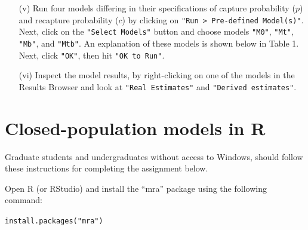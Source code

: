 \documentclass[12pt]{article}\usepackage[]{graphicx}\usepackage[]{color}
\makeatletter
\newcommand{\hlstr}[1]{\textcolor[rgb]{0.749,0.012,0.012}{#1}}%
\newcommand{\hlstd}[1]{\textcolor[rgb]{0,0,0}{#1}}%
\newcommand{\hlkwd}[1]{\textcolor[rgb]{0.004,0.004,0.506}{#1}}%
\newenvironment{kframe}{%
 \def\at@end@of@kframe{}%
 \ifinner\ifhmode%
  \def\at@end@of@kframe{\end{minipage}}%
  \begin{minipage}{\columnwidth}%
 \fi\fi%
 \def\FrameCommand##1{\hskip\@totalleftmargin \hskip-\fboxsep
 \colorbox{shadecolor}{##1}\hskip-\fboxsep
     \hskip-\linewidth \hskip-\@totalleftmargin \hskip\columnwidth}%
 \MakeFramed {\advance\hsize-\width
   \@totalleftmargin\z@ \linewidth\hsize
   \@setminipage}}%
 {\par\unskip\endMakeFramed%
 \at@end@of@kframe}
\newenvironment{knitrout}{}{} %
\makeatother
\begin{document}
\begin{enumerate}
  \item[(v)] Run four models differing in their specifications of
    capture probability ($p$) and recapture probability ($c$) by
    clicking on  \verb+"Run > Pre-defined Model(s)"+. Next, click on the
    \verb+"Select Models"+ button and choose models \verb+"M0"+,
    \verb+"Mt"+, \verb+"Mb"+, and \verb+"Mtb"+. An explanation of these
    models is shown below in Table 1. Next, click \verb+"OK"+, then
    hit \verb+"OK to Run"+. 
  \item[(vi)] Inspect the model results, by right-clicking on one of
    the models in the Results Browser and look at
    \verb+"Real Estimates"+ and \verb+"Derived estimates"+. 
\end{enumerate}




\section*{Closed-population models in R}


Graduate students and undergraduates without access to Windows, should
follow these instructions for completing the assignment below.

Open R (or RStudio) and install the ``mra'' package using the
following command: 

\begin{knitrout}
\color{fgcolor}\begin{kframe}
\begin{alltt}
\hlkwd{install.packages}\hlstd{(}\hlstr{"mra"}\hlstd{)}
\end{alltt}
\end{kframe}
\end{knitrout}
\end{document}
